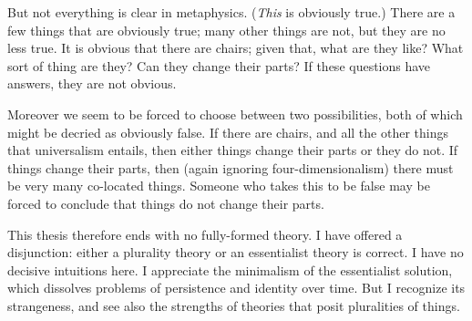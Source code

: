\documentclass[11pt]{article}
\begin{document}
\begin{spacing}{1.5}
But not everything is clear in metaphysics.  ({\em This} is obviously
true.)  There are a few things that are obviously true; many other
things are not, but they are no less true.  It is obvious that there
are chairs; given that, what are they like?  What sort of thing are
they?  Can they change their parts?  If these questions have answers,
they are not obvious.

Moreover we seem to be forced to choose between two possibilities,
both of which might be decried as obviously false.  If there are
chairs, and all the other things that universalism entails, then
either things change their parts or they do not.  If things change
their parts, then (again ignoring four-dimensionalism) there must be
very many co-located things.  Someone who takes this to be false may
be forced to conclude that things do not change their parts.

This thesis therefore ends with no fully-formed theory.  I have
offered a disjunction: either a plurality theory or an essentialist
theory is correct. I have no decisive intuitions here.  I appreciate
the minimalism of the essentialist solution, which dissolves problems
of persistence and identity over time.  But I recognize its
strangeness, and see also the strengths of theories that posit
pluralities of things.

\ifstandalone
\end{spacing}


\fi
\end{document}
